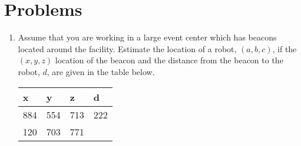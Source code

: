 \hypertarget{problems}{%
\section{Problems}\label{problems}}

\begin{enumerate}
\item
  Assume that you are working in a large event center which has beacons
  located around the facility. Estimate the location of a robot,
  \((a,b,c)\), if the \((x,y,z)\) location of the beacon and the
  distance from the beacon to the robot, \(d\), are given in the table
  below.

  \begin{longtable}[]{@{}llll@{}}
  \toprule
  \begin{minipage}[b]{0.07\columnwidth}\raggedright
  x\strut
  \end{minipage} & \begin{minipage}[b]{0.07\columnwidth}\raggedright
  y\strut
  \end{minipage} & \begin{minipage}[b]{0.07\columnwidth}\raggedright
  z\strut
  \end{minipage} & \begin{minipage}[b]{0.07\columnwidth}\raggedright
  d\strut
  \end{minipage}\tabularnewline
  \midrule
  \endhead
  \begin{minipage}[t]{0.07\columnwidth}\raggedright
  884\strut
  \end{minipage} & \begin{minipage}[t]{0.07\columnwidth}\raggedright
  554\strut
  \end{minipage} & \begin{minipage}[t]{0.07\columnwidth}\raggedright
  713\strut
  \end{minipage} & \begin{minipage}[t]{0.07\columnwidth}\raggedright
  222\strut
  \end{minipage}\tabularnewline
  \begin{minipage}[t]{0.07\columnwidth}\raggedright
  120\strut
  \end{minipage} & \begin{minipage}[t]{0.07\columnwidth}\raggedright
  703\strut
  \end{minipage} & \begin{minipage}[t]{0.07\columnwidth}\raggedright
  771\strut
  \end{minipage} & \begin{minipage}[t]{0.07\columnwidth}\raggedright

\end{minipage}
\end{longtable}
\end{enumerate}
